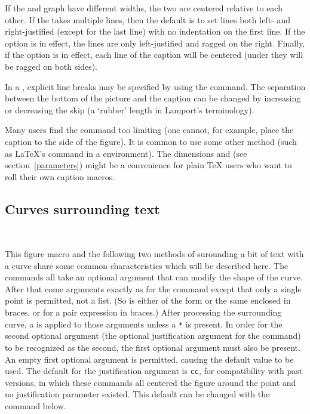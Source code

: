 \documentclass[letterpaper]{article}
\begin{document}
If the  and graph have different widths, the two are
centered relative to each other. If the  takes multiple
lines, then the default is to set lines both left- and right-justified
(except for the last line) with no indentation on the first line. If the
option  is in effect, the lines are only
left-justified and ragged on the right. Finally, if the option
 is in effect, each line of the caption will be
centered (under  they will be ragged on both sides).

In a , explicit line breaks may be specified by using the
\bbsl{} command. The separation between the bottom of the picture and
the caption can be changed by increasing or decreasing the skip
(a `rubber' length in Lamport's terminology).

Many \mfp{} users find the  command too limiting (one
cannot, for example, place the caption to the side of the figure). It is
common to use some other method (such as \LaTeX{}'s  command
in a  environment). The dimensions  and
 (see section~\ref{parameters}) might be a convenience
for plain \TeX{} users who want to roll their own caption macros.


\subsection{Curves surrounding text}\label{surrounding}

\begin{cd}
%
    \\
%
\end{cd}

This figure macro and the following two methods of surounding a bit of
text with a curve share some common characteristics which will be
described here. The commands all take an optional argument that can
modify the shape of the curve. After that come arguments exactly as for
the  command except that only a single point is permitted,
not a list. (So  is either of the form
 or the same enclosed in braces, or for
 a pair expression in braces.) After processing the
surrounding curve, a  is applied to those arguments unless a
\texttt{*} is present. In order for the second optional argument (the
optional justification argument for the  command) to be
recognized as the second, the first optional argument must also be
present. An empty first optional argument is permitted, causing the
default value to be used. The default for the justification argument is
\texttt{cc}, for compatibility with past \mfp{} versions, in which these
commands all centered the figure around the point and no justification
parameter existed. This default can be changed with the
 command below.
\end{document}
